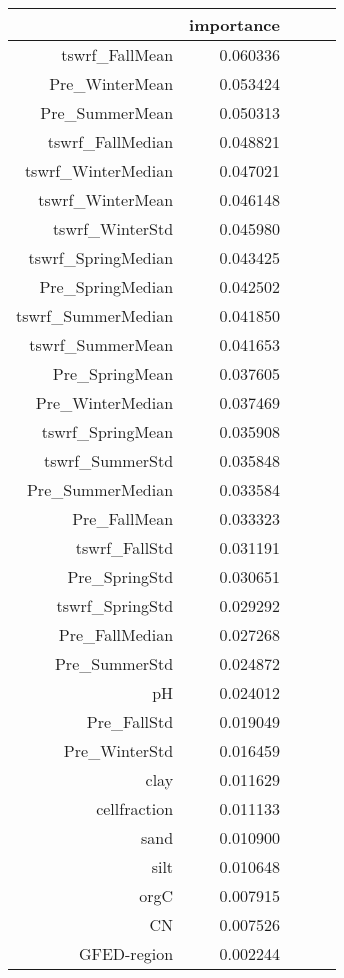 \begin{tabular}{rrrrr}
\toprule
 & importance \\
\midrule
tswrf_FallMean & 0.060336 \\
Pre_WinterMean & 0.053424 \\
Pre_SummerMean & 0.050313 \\
tswrf_FallMedian & 0.048821 \\
tswrf_WinterMedian & 0.047021 \\
tswrf_WinterMean & 0.046148 \\
tswrf_WinterStd & 0.045980 \\
tswrf_SpringMedian & 0.043425 \\
Pre_SpringMedian & 0.042502 \\
tswrf_SummerMedian & 0.041850 \\
tswrf_SummerMean & 0.041653 \\
Pre_SpringMean & 0.037605 \\
Pre_WinterMedian & 0.037469 \\
tswrf_SpringMean & 0.035908 \\
tswrf_SummerStd & 0.035848 \\
Pre_SummerMedian & 0.033584 \\
Pre_FallMean & 0.033323 \\
tswrf_FallStd & 0.031191 \\
Pre_SpringStd & 0.030651 \\
tswrf_SpringStd & 0.029292 \\
Pre_FallMedian & 0.027268 \\
Pre_SummerStd & 0.024872 \\
pH & 0.024012 \\
Pre_FallStd & 0.019049 \\
Pre_WinterStd & 0.016459 \\
clay & 0.011629 \\
cellfraction & 0.011133 \\
sand & 0.010900 \\
silt & 0.010648 \\
orgC & 0.007915 \\
CN & 0.007526 \\
GFED-region & 0.002244 \\
\bottomrule
\end{tabular}
